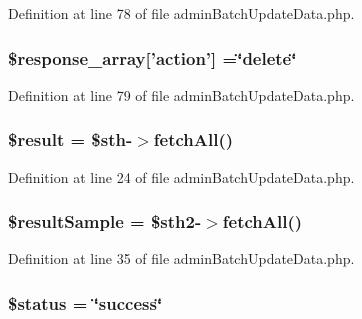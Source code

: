 Definition at line 78 of file admin\-Batch\-Update\-Data.\-php.

\hypertarget{admin_batch_update_data_8php_ae768978a0cdc416c0d63d798c85c8784}{
\subsubsection[{\$response\-\_\-array}]{\setlength{\rightskip}{0pt plus 5cm}\$response\-\_\-array\mbox{[}'action'\mbox{]} =\char`\"{}delete\char`\"{}}}\label{admin_batch_update_data_8php_ae768978a0cdc416c0d63d798c85c8784}


Definition at line 79 of file admin\-Batch\-Update\-Data.\-php.

\hypertarget{admin_batch_update_data_8php_a112ef069ddc0454086e3d1e6d8d55d07}{
\subsubsection[{\$result}]{\setlength{\rightskip}{0pt plus 5cm}\$result = \$sth-\/$>$fetch\-All()}}\label{admin_batch_update_data_8php_a112ef069ddc0454086e3d1e6d8d55d07}


Definition at line 24 of file admin\-Batch\-Update\-Data.\-php.

\hypertarget{admin_batch_update_data_8php_ae3e385c534eade5527fe9db4dbc181b5}{
\subsubsection[{\$result\-Sample}]{\setlength{\rightskip}{0pt plus 5cm}\$result\-Sample = \$sth2-\/$>$fetch\-All()}}\label{admin_batch_update_data_8php_ae3e385c534eade5527fe9db4dbc181b5}


Definition at line 35 of file admin\-Batch\-Update\-Data.\-php.

\hypertarget{admin_batch_update_data_8php_a58391ea75f2d29d5d708d7050b641c33}{
\subsubsection[{\$status}]{\setlength{\rightskip}{0pt plus 5cm}\$status = \char`\"{}success\char`\"{}}}\label{admin_batch_update_data_8php_a58391ea75f2d29d5d708d7050b641c33}


